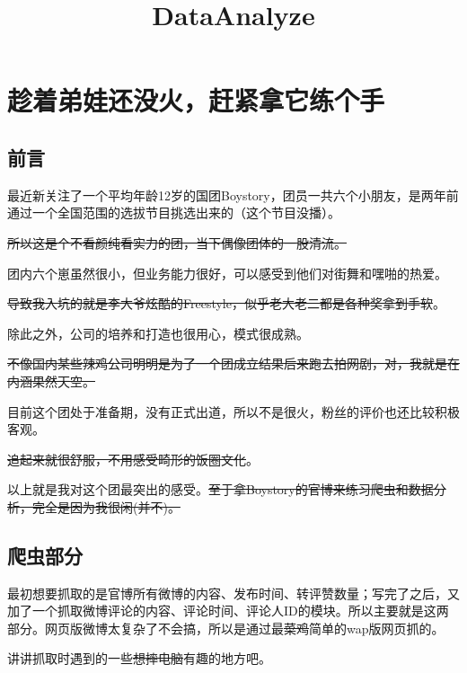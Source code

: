 \documentclass[11pt]{article}
\title{DataAnalyze}
\begin{document}
    
    
    \maketitle
    
    

    
    \section{趁着弟娃还没火，赶紧拿它练个手}\label{ux8d81ux7740ux5f1fux5a03ux8fd8ux6ca1ux706bux8d76ux7d27ux62ffux5b83ux7ec3ux4e2aux624b}

    \subsection{前言}\label{ux524dux8a00}

    最近新关注了一个平均年龄12岁的国团Boystory，团员一共六个小朋友，是两年前通过一个全国范围的选拔节目挑选出来的（这个节目没播）。

\sout{所以这是个不看颜纯看实力的团，当下偶像团体的一股清流。}

团内六个崽虽然很小，但业务能力很好，可以感受到他们对街舞和嘿啪的热爱。

\sout{导致我入坑的就是李大爷炫酷的Freestyle，似乎老大老二都是各种奖拿到手软}。

除此之外，公司的培养和打造也很用心，模式很成熟。

\sout{不像国内某些辣鸡公司明明是为了一个团成立结果后来跑去拍网剧，对，我就是在内涵果然天空。}

目前这个团处于准备期，没有正式出道，所以不是很火，粉丝的评价也还比较积极客观。

\sout{追起来就很舒服，不用感受畸形的饭圈文化}。

以上就是我对这个团最突出的感受。\sout{至于拿Boystory的官博来练习爬虫和数据分析，完全是因为我很闲(并不)。}

    \subsection{爬虫部分}\label{ux722cux866bux90e8ux5206}

    最初想要抓取的是官博所有微博的内容、发布时间、转评赞数量；写完了之后，又加了一个抓取微博评论的内容、评论时间、评论人ID的模块。所以主要就是这两部分。网页版微博太复杂了不会搞，所以是通过最\sout{菜鸡}简单的wap版网页抓的。

讲讲抓取时遇到的一些\sout{想摔电脑}有趣的地方吧。
\end{document}
